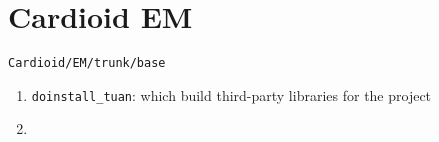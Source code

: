 \chapter{Cardioid EM}


\verb!Cardioid/EM/trunk/base!
\begin{enumerate}
  \item \verb!doinstall_tuan!: which build third-party libraries for the project
  \item 
\end{enumerate}